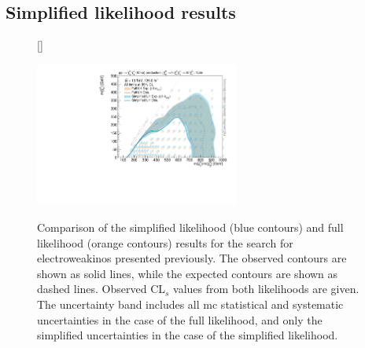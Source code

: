 
\chapter{}
\ifpdf
\graphicspath{{chapter-simplify/Figs/Raster/}{chapter-simplify/Figs/PDF/}{chapter-simplify/Figs/}}
\else
\graphicspath{{chapter-simplify/Figs/Vector/}{chapter-simplify/Figs/}}
\fi

\section{Simplified likelihood results}

\begin{figure}
[\FBwidth]
{\caption{Comparison of the simplified likelihood (blue contours) and full likelihood (orange contours) results for the search for electroweakinos presented previously. The observed contours are shown as solid lines, while the expected contours are shown as dashed lines. Observed CL$_s$ values from both likelihoods are given. The uncertainty band includes all \gls{mc} statistical and systematic uncertainties in the case of the full likelihood, and only the simplified uncertainties in the case of the simplified likelihood.}\label{fig:app_results_simplify_1Lbb}}
{\includegraphics[width=0.60\textwidth]{exclusion_1Lbb_CLs_noLabel}}
\end{figure}



